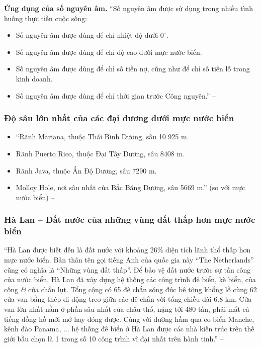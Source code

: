\documentclass{article}
\numberwithin{equation}{section}
\begin{document}
\noindent\textbf{Ứng dụng của số nguyên âm.} ``Số nguyên âm được sử dụng trong nhiều tình huống thực tiễn cuộc sống:
\begin{itemize}
	\item Số nguyên âm được dùng để chỉ nhiệt độ dưới $0^\circ$.
	\item Số nguyên âm được dùng để chỉ độ cao dưới mực nước biển.
	\item Số nguyên âm được dùng để chỉ số tiền nợ, cũng như để chỉ số tiền lỗ trong kinh doanh.
	\item Số nguyên âm được dùng để chỉ thời gian trước Công nguyên.'' -- \cite[p. 62]{Thai_Anh_Dat_Ha_Loan_Nam_Quang_Toan_6_tap_1}
\end{itemize}

\subsubsection{Độ sâu lớn nhất của các đại dương dưới mực nước biển}
\begin{itemize}
	\item ``Rãnh Mariana, thuộc Thái Bình Dương, sâu 10 925 m.
	\item Rãnh Puerto Rico, thuộc Đại Tây Dương, sâu 8408 m.
	\item Rãnh Java, thuộc Ấn Độ Dương, sâu 7290 m.
	\item Molloy Hole, nơi sâu nhất của Bắc Băng Dương, sâu 5669 m.'' (so với mực nước biển) -- \cite[p. 63]{Thai_Anh_Dat_Ha_Loan_Nam_Quang_Toan_6_tap_1}
\end{itemize}

\subsubsection{Hà Lan -- Đất nước của những vùng đất thấp hơn mực nước biển}
``Hà Lan được biết đến là đất nước với khoảng 26\% diện tích lãnh thổ thấp hơn mực nước biển. Bản thân tên gọi tiếng Anh của quốc gia này ``The Netherlands'' cũng có nghĩa là ``Những vùng đất thấp''. Để bảo vệ đất nước trước sự tấn công của nước biển, Hà Lan đã xây dựng hệ thống các công trình đê biển, kè biển, của cống \textit{\&} cửa chắn lụt. Tổng cộng có 65 đê chắn sóng đúc bê tông khổng lồ cùng 62 cửa van bằng thép di động treo giữa các đê chắn với tổng chiều dài 6.8 km. Cửa van lớn nhất nằm ở phần sâu nhất của châu thổ, nặng tới 480 tấn, phải mất cả tiếng đồng hồ mới mở hay đóng được. Cùng với đường hầm qua eo biển Manche, kênh đào Panama, $\ldots$ hệ thống đê biển ở Hà Lan được các nhà kiến trúc trên thế giới bầu chọn là 1 trong số 10 công trình vĩ đại nhất trên hành tinh.'' -- \cite[p. 63]{Thai_Anh_Dat_Ha_Loan_Nam_Quang_Toan_6_tap_1}
\end{document}
